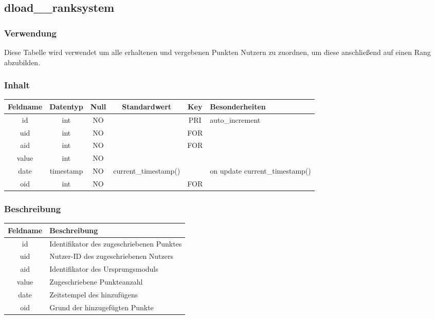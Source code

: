 \subsection{dload\_\_ranksystem}
\subsubsection{Verwendung} Diese Tabelle wird verwendet um alle erhaltenen und vergebenen Punkten Nutzern zu zuordnen, um diese anschließend auf einen Rang abzubilden.
\subsubsection{Inhalt}
\begin{table}[H]
	\begin{tabular}{|c|c|c|c|c|p{3.5cm}|}
		\hline
		\textbf{Feldname} & \textbf{Datentyp} & \textbf{Null} & \textbf{Standardwert} & \textbf{Key}   & \textbf{Besonderheiten} \\ \hline
		id & int & NO &  & PRI & auto\_increment \\ \hline
		uid & int & NO &  & FOR & \\ \hline
		aid & int & NO &  & FOR & \\ \hline
		value & int & NO &  &  & \\ \hline
		date & timestamp & NO & current\_timestamp() &  & on update current\_timestamp()\\ \hline
		oid & int & NO &  & FOR & \\ \hline
	\end{tabular}
\end{table}
\subsubsection{Beschreibung}
\begin{table}[H]
	\begin{tabular}{|c|p{12cm}|}
		\hline
		\textbf{Feldname} & \textbf{Beschreibung} \\ \hline
		id & Identifikator des zugeschriebenen Punktes \\ \hline
		uid & Nutzer-ID des zugeschriebenen Nutzers \\ \hline
		aid & Identifikator des Ursprungsmoduls \\ \hline
		value & Zugeschriebene Punkteanzahl \\ \hline
		date & Zeitstempel des hinzufügens \\ \hline
		oid & Grund der hinzugefügten Punkte \\ \hline
	\end{tabular}
\end{table}
